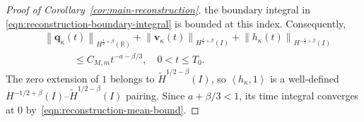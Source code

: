 \documentclass[11pt,reqno]{amsart}
\theoremstyle{plain}
\theoremstyle{definition}
\numberwithin{equation}{section}
\newcommand{\wt}[1]{\widetilde{#1}}
\newcommand{\bm}[1]{\boldsymbol{#1}}
\newcommand{\norm}[1]{\left\lVert #1 \right\rVert}
\newcommand{\dual}[2]{\left\langle #1,#2 \right\rangle}
\newcommand{\R}{\mathbb{R}}
\newcommand{\hi}[1]{H^{#1}(I)}
\newcommand{\thi}[1]{\wt H^{#1}(I)}
\newcommand{\hr}[1]{H^{#1}(\R)}
\begin{document}
\begin{proof}[Proof of Corollary~\ref{cor:main-reconstruction}]
the boundary integral in \eqref{eqn:reconstruction-boundary-integral}
is bounded at this index.
Consequently,
\begin{equation}\label{eqn:reconstruction-mean-bound}
\begin{aligned}
    &\norm{\bm q_\kappa(t)}_{\hr{\frac12+\beta}}
    +\norm{\bm v_\kappa(t)}_{\hi{\frac12+\beta}}
    +\norm{h_\kappa(t)}_{\hi{-\frac12+\beta}}\\
    &\hspace{3em}\le C_{M,m}t^{-a-\beta/3},
    \quad 0<t\le T_0.
\end{aligned}
\end{equation}
The zero extension of $1$ belongs to $\thi{1/2-\beta}$, so
$\dual{h_\kappa}{1}$ is a well-defined
$H^{-1/2+\beta}(I)$--$\thi{1/2-\beta}$ pairing.
Since $a+\beta/3<1$, its time integral converges at $0$
by~\eqref{eqn:reconstruction-mean-bound}.


\end{proof}
\end{document}
